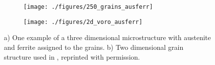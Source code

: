 \documentclass[crystal_plast.tex]{subfiles}
\begin{document}
 \begin{figure}[htpb!]
\centering
\begin{subfigure}{.5\textwidth}
  \centering
  \texttt{[image: ./figures/250\_grains\_ausferr]}
  \caption{}
  \label{fig:ausferr_3d}
\end{subfigure}%
\begin{subfigure}{.6\textwidth}
  \centering
  \texttt{[image: ./figures/2d\_voro\_ausferr]}
  \caption{}
  \label{fig:ausferr_2d}
\end{subfigure}
\caption{a) One example of a three dimensional microstructure with austenite and ferrite assigned to the grains.  b) Two dimensional grain structure used in \cite{lillbacka2007multiscale}, reprinted with permission.}
\label{fig:ausferr}
\end{figure}


%
%
\end{document}
